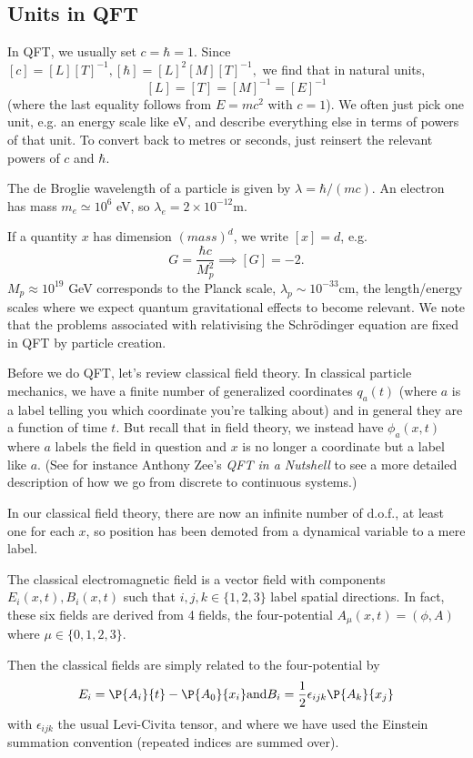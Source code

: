 \subsection*{Units in QFT} In QFT, we usually set $c=\hbar=1$. Since $[c]=[L][T]^{-1}, [\hbar]=[L]^2[M][T]^{-1},$ we find that in natural units, $$[L]=[T]=[M]^{-1}=[E]^{-1}$$ (where the last equality follows from $E=mc^2$ with $c=1$). We often just pick one unit, e.g. an energy scale like eV, and describe everything else in terms of powers of that unit. To convert back to metres or seconds, just reinsert the relevant powers of $c$ and $\hbar$.

\begin{exm}
The de Broglie wavelength of a particle is given by $\lambda=\hbar/(mc)$. An electron has mass $m_e\simeq 10^6$ eV, so $\lambda_e = 2\times 10^{-12}$m.
\end{exm}

If a quantity $x$ has dimension $(mass)^d$, we write $[x]=d$, e.g. $$G=\frac{\hbar c}{M_p^2}\implies [G]=-2.$$  $M_p \approx 10^{19}$ GeV corresponds to the Planck scale, $\lambda_p \sim 10^{-33}$cm, the length/energy scales where we expect quantum gravitational effects to become relevant. We note that the problems associated with relativising the Schr\"odinger equation are fixed in QFT by particle creation.

Before we do QFT, let's review classical field theory. In classical particle mechanics, we have a finite number of generalized coordinates $q_a(t)$ (where $a$ is a label telling you which coordinate you're talking about) and in general they are a function of time $t$. But recall that in field theory, we instead have $\phi_a(x,t)$ where $a$ labels the field in question and $x$ is no longer a coordinate but a label like $a$. (See for instance Anthony Zee's \textit{QFT in a Nutshell} to see a more detailed description of how we go from discrete to continuous systems.)

In our classical field theory, there are now an infinite number of d.o.f., at least one for each $x$, so position has been demoted from a dynamical variable to a mere label.

\begin{exm}
The classical electromagnetic field is a vector field with components $E_i(x,t), B_i(x,t)$ such that $i,j,k\in \{1,2,3\}$ label spatial directions. In fact, these six fields are derived from 4 fields, the four-potential $A_\mu(x,t)=(\phi,A)$ where $\mu\in\{0,1,2,3\}$.

Then the classical fields are simply related to the four-potential by
$$E_i=\P{A_i}{t}-\P{A_0}{x_i} \text{and} B_i=\frac{1}{2}\epsilon_{ijk} \P{A_k}{x_j}$$
with $\epsilon_{ijk}$ the usual Levi-Civita tensor, and where we have used the Einstein summation convention (repeated indices are summed over).
\end{exm}

